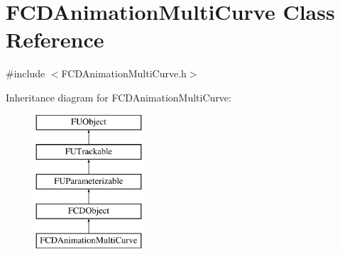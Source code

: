 \hypertarget{classFCDAnimationMultiCurve}{
\section{FCDAnimationMultiCurve Class Reference}
\label{classFCDAnimationMultiCurve}
}


{\ttfamily \#include $<$FCDAnimationMultiCurve.h$>$}

Inheritance diagram for FCDAnimationMultiCurve:\begin{figure}[H]
\begin{center}
\leavevmode
\includegraphics[height=5.000000cm]{classFCDAnimationMultiCurve}
\end{center}
\end{figure}
